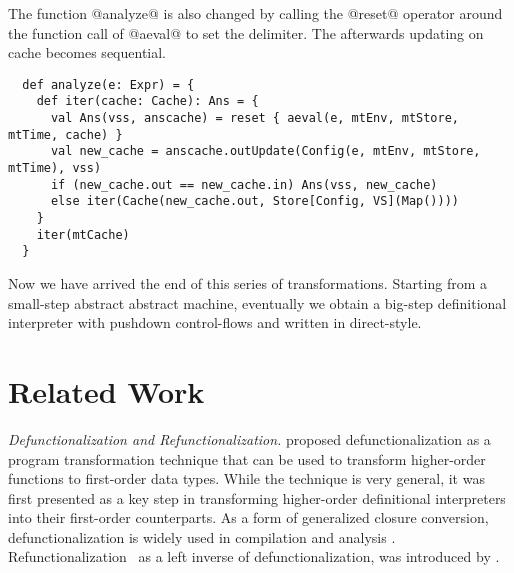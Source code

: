 \documentclass[acmsmall, review]{acmart}\settopmatter{}
\begin{document}
The function @analyze@ is also changed by calling the @reset@ operator around the function 
call of @aeval@ to set the delimiter. The afterwards updating on cache becomes sequential.

\begin{lstlisting}
  def analyze(e: Expr) = {
    def iter(cache: Cache): Ans = {
      val Ans(vss, anscache) = reset { aeval(e, mtEnv, mtStore, mtTime, cache) }
      val new_cache = anscache.outUpdate(Config(e, mtEnv, mtStore, mtTime), vss)
      if (new_cache.out == new_cache.in) Ans(vss, new_cache)
      else iter(Cache(new_cache.out, Store[Config, VS](Map())))
    }
    iter(mtCache)
  }
\end{lstlisting}

Now we have arrived the end of this series of transformations. Starting from a
small-step abstract abstract machine, eventually we obtain a big-step definitional
interpreter with pushdown control-flows and written in direct-style.


\section{Related Work}\label{sec:related}

\textit{Defunctionalization and Refunctionalization.}
\citet{Reynolds:72} proposed defunctionalization as a program transformation 
technique that can be used to transform higher-order functions to first-order data types. 
While the technique is very general, it was first presented as a key step in
transforming higher-order definitional interpreters into their first-order 
counterparts.
As a form of generalized closure conversion,
defunctionalization is widely used in compilation and analysis \cite{pottier2006polymorphic, 
Eisenberg:2014:PFT:2633357.2633361, fourtounis2014modular, 10.1007/3-540-46425-5_4, consel1993tour}.
Refunctionalization~\cite{Danvy:2006:RW:2171265.2171268} as a 
left inverse of defunctionalization, was introduced 
by \citeauthor{Danvy:2006:RW:2171265.2171268,DANVY2009534}.
\end{document}
